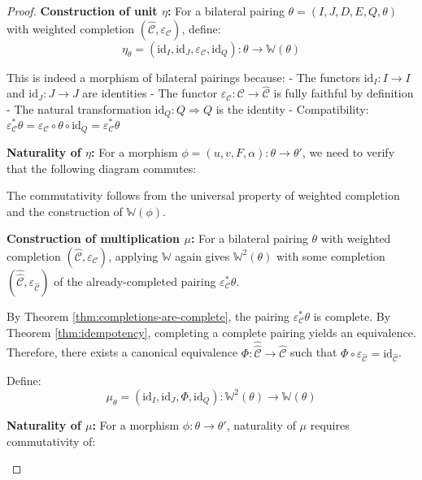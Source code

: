 \documentclass[11pt]{article}
\theoremstyle{plain}
\theoremstyle{definition}
\theoremstyle{remark}
\newcommand{\C}{\mathcal{C}}
\newcommand{\id}{\mathrm{id}}
\newcommand{\wh}[1]{\widehat{#1}}
\begin{document}
\begin{proof}
\textbf{Construction of unit $\eta$:}
For a bilateral pairing $\theta = (I, J, D, E, Q, \theta)$ with weighted completion $(\wh{\C}, \varepsilon_\C)$, define:
$$\eta_\theta = (\id_I, \id_J, \varepsilon_\C, \id_Q) : \theta \to \mathbb{W}(\theta)$$

This is indeed a morphism of bilateral pairings because:
- The functors $\id_I : I \to I$ and $\id_J : J \to J$ are identities
- The functor $\varepsilon_\C : \C \to \wh{\C}$ is fully faithful by definition
- The natural transformation $\id_Q : Q \Rightarrow Q$ is the identity
- Compatibility: $\varepsilon_\C^* \theta = \varepsilon_\C \circ \theta \circ \id_Q = \varepsilon_\C^* \theta$ 

\textbf{Naturality of $\eta$:}
For a morphism $\phi = (u, v, F, \alpha) : \theta \to \theta'$, we need to verify that the following diagram commutes:
\begin{center}
\end{center}

The commutativity follows from the universal property of weighted completion and the construction of $\mathbb{W}(\phi)$.

\textbf{Construction of multiplication $\mu$:}
For a bilateral pairing $\theta$ with weighted completion $(\wh{\C}, \varepsilon_\C)$, applying $\mathbb{W}$ again gives $\mathbb{W}^2(\theta)$ with some completion $(\wh{\wh{\C}}, \varepsilon_{\wh{\C}})$ of the already-completed pairing $\varepsilon_\C^* \theta$.

By Theorem \ref{thm:completions-are-complete}, the pairing $\varepsilon_\C^* \theta$ is complete. By Theorem \ref{thm:idempotency}, completing a complete pairing yields an equivalence. Therefore, there exists a canonical equivalence $\Phi : \wh{\wh{\C}} \to \wh{\C}$ such that $\Phi \circ \varepsilon_{\wh{\C}} = \id_{\wh{\C}}$.

Define: $$\mu_\theta = (\id_I, \id_J, \Phi, \id_Q) : \mathbb{W}^2(\theta) \to \mathbb{W}(\theta)$$

\textbf{Naturality of $\mu$:}
For a morphism $\phi : \theta \to \theta'$, naturality of $\mu$ requires commutativity of:
\begin{center}
\end{center}


\end{proof}
\end{document}
